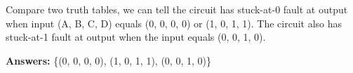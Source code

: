 Compare two truth tables, we can tell the circuit has stuck-at-0 fault at output when input (A, B, C, D) equals (0, 0, 0, 0) or (1, 0, 1, 1). The circuit also has stuck-at-1 fault at output when the input equals (0, 0, 1, 0).


\textbf{Answers:} \{(0, 0, 0, 0), (1, 0, 1, 1), (0, 0, 1, 0)\}
